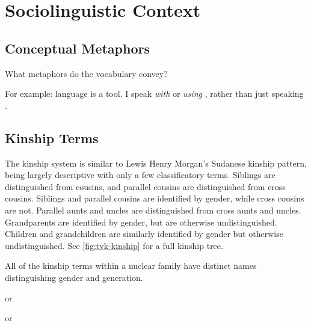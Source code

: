 \chapter{Sociolinguistic Context}
\label{app:tvk-sociolinguistic-context}

\section{Conceptual Metaphors}
\label{sec:tvk-conceptual-metaphors}

What metaphors do the vocabulary convey?

For example: language is a tool. I speak \textit{with} or \textit{using} \langtvk, rather than just speaking \langtvk.

\section{Kinship Terms}
\label{sec:tvk-kinship-terms}

The \langtvk{} kinship system is similar to Lewis Henry Morgan's Sudanese kinship pattern, being largely descriptive with only a few classificatory terms. Siblings are distinguished from cousins, and parallel cousins are distinguished from cross cousins. Siblings and parallel cousins are identified by gender, while cross cousins are not. Parallel aunts and uncles are distinguished from cross aunts and uncles. Grandparents are identified by gender, but are otherwise undistinguished. Children and grandchildren are similarly identified by gender but otherwise undistinguished. See \autoref{fig:tvk-kinship} for a full kinship tree.

All of the kinship terms within a nuclear family have distinct names distinguishing gender and generation.

\begin{description}[leftmargin=!,labelwidth=\widthof{\bfseries daughter}]
	\item[mother]   
	\item[father]   
	\item[parent]   
	\item[sister]   
	\item[brother]   
	\item[sibling]   
	\item[wife]    or 
	\item[husband]    or 
	\item[spouse]   
	\item[daughter]   
	\item[son]   
	\item[child]   
\end{description}

